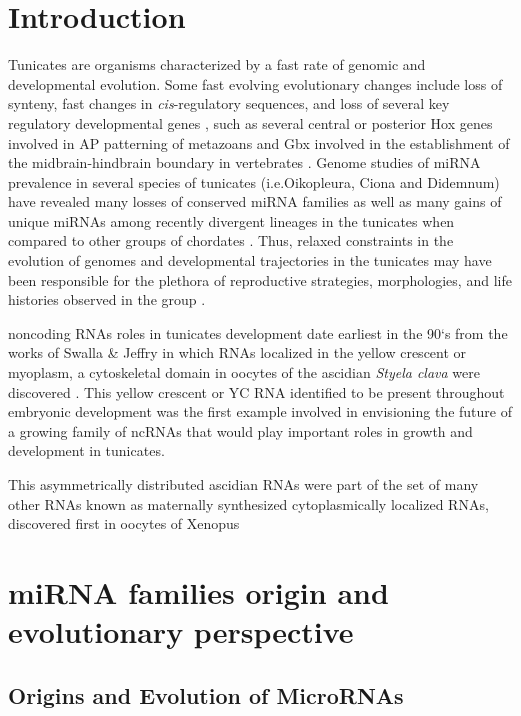 \documentclass[graybox]{svmult}
\begin{document}
\section{Introduction}
\label{sec:1}

Tunicates are organisms characterized by a fast rate of genomic and 
developmental evolution. Some fast evolving evolutionary changes include loss of 
synteny, fast changes in \textit{cis}-regulatory sequences, and loss of several 
key regulatory developmental genes \cite{Satou2008, Denoeud1381}, such as 
several central or posterior Hox genes involved in AP patterning 
of metazoans \cite{Ikuta:2005} and Gbx involved in the establishment of 
the midbrain-hindbrain boundary in vertebrates \cite{Yagi2003}. Genome 
studies of miRNA prevalence in several species of tunicates (i.e.Oikopleura, 
Ciona and Didemnum) have revealed many losses of conserved miRNA families as 
well as many gains of unique miRNAs among recently divergent lineages in the 
tunicates when compared to other groups of chordates \cite{Fu2008, 
Velandia-Huerto2016}. Thus, relaxed constraints in the evolution of 
genomes and developmental trajectories in the tunicates may have been 
responsible for the plethora of reproductive strategies, morphologies, and life 
histories observed in the group \cite{Holland2015}.

noncoding RNAs roles in tunicates development date earliest in the 90`s from 
the works of Swalla \& Jeffry in which RNAs localized in the yellow crescent or 
myoplasm, a cytoskeletal domain in oocytes of the ascidian \textit{Styela clava} 
were discovered \cite{Swalla1995}. This  yellow crescent or YC RNA identified to 
be present throughout embryonic development was the first example involved in 
envisioning the future of a growing family of ncRNAs that would play important 
roles in growth and development in tunicates\cite{Swalla1995}.

This asymmetrically distributed ascidian RNAs were part of the set of many 
other RNAs known as maternally synthesized cytoplasmically localized RNAs, 
discovered first in oocytes of Xenopus \cite{Bashirullah1998}

\section{miRNA families origin and evolutionary perspective}
\label{sec:2}

\subsection{Origins and Evolution of MicroRNAs}
\end{document}
